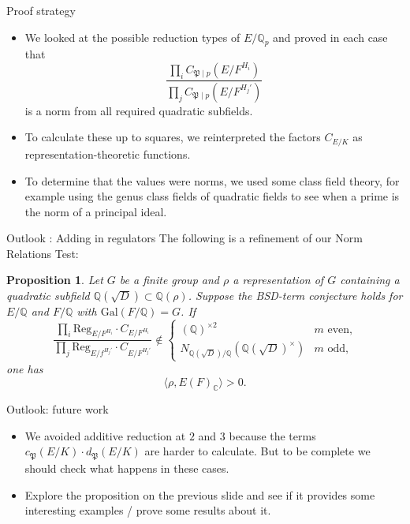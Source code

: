 \documentclass{beamer}
\newcommand{\Gal}{\mathrm{Gal}}
\newcommand{\Reg}{\mathrm{Reg}}
\newcommand{\bQ}{\mathbb{Q}}
\newcommand{\bC}{\mathbb{C}}
\newcommand{\fP}{\mathfrak{P}}
\theoremstyle{plain}
\newtheorem{proposition}[thm]{Proposition}
\begin{document}
\begin{frame}{Proof strategy}
    \begin{itemize}
        \item We looked at the possible reduction types of $E / \bQ_p$ and proved in each case that 
    $$\frac{\prod_i C_{\fP \mid p}(E / F^{H_i})}{\prod_j C_{\fP \mid p}(E / F^{H_j'})}$$
    is a norm from all required quadratic subfields. \pause 
    \item 
    To calculate these up to squares, we reinterpreted the factors $C_{E / K}$ as representation-theoretic functions. \pause 
    \item
    To determine that the values were norms, we used some class field theory, for example using the genus class fields of quadratic fields to see when a prime is the norm of a principal ideal. 
    \end{itemize}
 \end{frame}

\begin{frame}{Outlook : Adding in regulators}
The following is a refinement of our Norm Relations Test:

\begin{proposition}
    Let $G$ be a finite group and $\rho$ a representation of $G$ containing a quadratic subfield $\bQ(\sqrt{D}) \subset \bQ(\rho)$. \pause Suppose the BSD-term conjecture holds for $E / \bQ$ and $F / \bQ$ with $\Gal(F / \bQ) = G$. \pause If    \[ \frac{\prod_i \Reg_{E / F^{H_i}} \cdot C_{E/F^{H_i}}}{\prod_j \Reg_{E / f^{H_j'}} \cdot C_{E/F^{H_j'}}} \not\in
    \begin{cases}
        (\bQ)^{\times 2} & m \text{ even,}\\
        N_{\bQ(\sqrt{D}) / \bQ}(\bQ(\sqrt{D})^{\times}) & m \text{ odd,}
    \end{cases}\]  one has 
    \[ \langle \rho, E(F)_{\bC} \rangle > 0 .\] 
\end{proposition}
\end{frame}

\begin{frame}{Outlook: future work}
\begin{itemize}
    \item We avoided additive reduction at $2$ and $3$ because the terms $c_{\fP}(E / K) \cdot d_{\fP}(E / K)$ are harder to calculate. But to be complete we should check what happens in these cases. \pause 
    \item Explore the proposition on the previous slide and see if it provides some interesting examples / prove some results about it. 
\end{itemize}
\end{frame}
\end{document}
